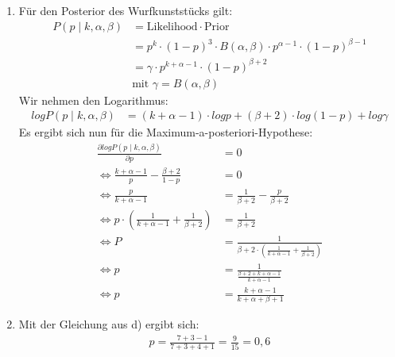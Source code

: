 \documentclass[a4paper,10pt]{article}
\begin{document}
\begin{enumerate}[~~a.)]
	 \item
	 Für den Posterior des Wurfkunststücks gilt:
	 \begin{align*}
	     P(p \mid k, \alpha, \beta) &= \text{Likelihood} \cdot \text{Prior} \\
	     &= p^k \cdot (1-p)^3 \cdot B(\alpha,\beta) \cdot p^{\alpha-1} \cdot (1-p)^{\beta-1} \\
	     &= \gamma \cdot p^{k+\alpha - 1} \cdot (1-p)^{\beta + 2} \\
	     &\text{mit } \gamma = B(\alpha,\beta) 
	 \end{align*}
	 Wir nehmen den Logarithmus:
	 \begin{align*}
	     log P(p \mid k, \alpha, \beta) &= (k+\alpha-1) \cdot log p + (\beta + 2) \cdot log (1-p) + log \gamma
	 \end{align*}
	 Es ergibt sich nun für die Maximum-a-posteriori-Hypothese:
	 \begin{align*}
	     \frac{\partial log P(p \mid k,\alpha, \beta)}{\partial p} &= 0 \\
	     \Leftrightarrow \frac{k+\alpha-1}{p} - \frac{\beta + 2}{1-p} &= 0 \\
	     \Leftrightarrow \frac{p}{k+\alpha-1} &= \frac{1}{\beta + 2} - \frac{p}{\beta + 2} \\
	     \Leftrightarrow p \cdot (\frac{1}{k+\alpha-1} + \frac{1}{\beta+2}) &= \frac{1}{\beta+2} \\
	     \Leftrightarrow P &= \frac{1}{\beta+2 \cdot (\frac{1}{k+\alpha-1} + \frac{1}{\beta+2})} \\ 
	     \Leftrightarrow p &= \frac{1}{\frac{\beta+2+k+\alpha-1}{k+\alpha-1}} \\
	     \Leftrightarrow p &= \frac{k+\alpha-1}{k+\alpha+\beta+1}
	 \end{align*}
	 
	 \item
	 Mit der Gleichung aus d) ergibt sich:
	 \begin{align*}
	     p = \frac{7+3-1}{7+3+4+1} = \frac{9}{15} = 0,6
	 \end{align*}
	\end{enumerate}
\end{document}
